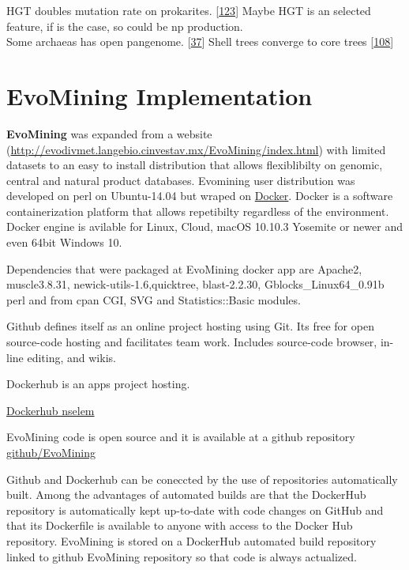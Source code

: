 \documentclass[12pt,twoside]{reedthesis}
\begin{document}
  HGT doubles mutation rate on prokarites.
  {[}\protect\hyperlink{ref-kooninux5fturbulentux5f2015}{123}{]} Maybe HGT
  is an selected feature, if is the case, so could be np production.\\
  Some archaeas has open pangenome.
  {[}\protect\hyperlink{ref-halachevux5fcalculatingux5f2011}{37}{]} Shell
  trees converge to core trees
  {[}\protect\hyperlink{ref-narechaniaux5frandomux5f2012}{108}{]}
  
  \section{EvoMining Implementation}\label{evomining-implementation}
  
  \textbf{EvoMining} was expanded from a website
  (\url{http://evodivmet.langebio.cinvestav.mx/EvoMining/index.html}) with
  limited datasets to an easy to install distribution that allows
  flexiblibilty on genomic, central and natural product databases.
  Evomining user distribution was developed on perl on Ubuntu-14.04 but
  wraped on \href{https://www.docker.com/}{Docker}. Docker is a software
  containerization platform that allows repetibilty regardless of the
  environment. Docker engine is avilable for Linux, Cloud, macOS 10.10.3
  Yosemite or newer and even 64bit Windows 10.
  
  Dependencies that were packaged at EvoMining docker app are Apache2,
  muscle3.8.31, newick-utils-1.6,quicktree, blast-2.2.30,
  Gblocks\_Linux64\_0.91b perl and from cpan CGI, SVG and
  Statistics::Basic modules.
  
  Github defines itself as an online project hosting using Git. Its free
  for open source-code hosting and facilitates team work. Includes
  source-code browser, in-line editing, and wikis.
  
  Dockerhub is an apps project hosting.
  
  \href{https://hub.docker.com/u/nselem/}{Dockerhub nselem}
  
  EvoMining code is open source and it is available at a github repository
  \href{https://github.com/nselem/EvoMining}{github/EvoMining}
  
  Github and Dockerhub can be coneccted by the use of repositories
  automatically built. Among the advantages of automated builds are that
  the DockerHub repository is automatically kept up-to-date with code
  changes on GitHub and that its Dockerfile is available to anyone with
  access to the Docker Hub repository. EvoMining is stored on a DockerHub
  automated build repository linked to github EvoMining repository so that
  code is always actualized.
  
\end{document}

